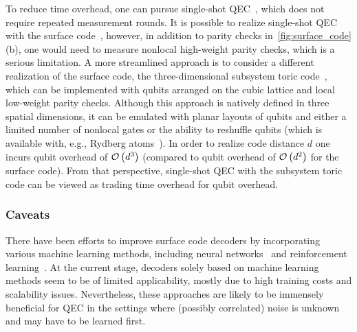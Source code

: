 \begin{refsection}
To reduce time overhead, one can pursue single-shot QEC~\cite{bombin2015SingleShotFTQEC}, which does not require repeated measurement rounds.
It is possible to realize single-shot QEC with the surface code~\cite{campbell2019theorySingleShot, ashikhmin2020quantumDataSyndromeCodes, delfosse2022beyondSingleShotFTQC}, however, in addition to parity checks in~\cref{fig:surface_code}(b), one would need to measure nonlocal high-weight parity checks, which is a serious limitation.
A more streamlined approach is to consider a different realization of the surface code, the three-dimensional subsystem toric code~\cite{kubica2022singleShotQECtoric,bridgeman2023liftingTopologicalCodes}, which can be implemented with qubits arranged on the cubic lattice and local low-weight parity checks.
Although this approach is natively defined in three spatial dimensions, it can be emulated with planar layouts of qubits and either a limited number of nonlocal gates or the ability to reshuffle qubits (which is available with, e.g., Rydberg atoms~\cite{saffman2010quantumInfoRydberg,browaeys2020manyBodyRydberg}).
In order to realize code distance $d$ one incurs qubit overhead of $\mathcal{O}\left( d^3 \right)$ (compared to qubit overhead of $\mathcal{O}\left( d^2 \right)$ for the surface code).
From that perspective, single-shot QEC with the subsystem toric code can be viewed as trading time overhead for qubit overhead.



\subsubsection*{Caveats}

There have been efforts to improve surface code decoders by incorporating various machine learning methods, including neural networks~\cite{torlai2017neuralDecoder,maskara2019advantagesNeuralNetworkDecoding,chamberland2022techniquesLocalGlobalDecoders} and reinforcement learning~\cite{sweke2021reinforcementLearningDecoders}.
At the current stage, decoders solely based on machine learning methods seem to be of limited applicability, mostly due to high training costs and scalability issues.
Nevertheless, these approaches are likely to be immensely beneficial for QEC in the settings where (possibly correlated) noise is unknown and may have to be learned first. 



\end{refsection}
